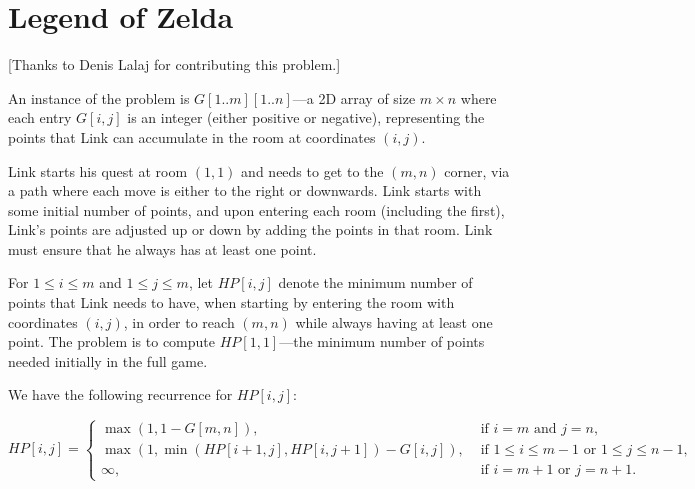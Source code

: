 \documentclass[11pt,fleqn]{exam}
\begin{document}
\newpage

\section{Legend of Zelda}

[Thanks to Denis Lalaj for contributing this problem.]

\vspace{.1in}

An instance of the problem is $G[1..m][1..n]$---a 2D array of size $m \times n$ where each entry $G[i,j]$ is an integer (either positive or negative), representing the points  that Link can accumulate in the room at coordinates $(i,j)$. 

Link starts his quest at room $(1,1)$ and needs to get to the $(m,n)$ corner, via a path where each move is either to the right or downwards. Link starts with some initial number of points, and upon entering each room (including the first), Link's points are adjusted up or down by adding the points in that room. Link must ensure that he always has at least one point.

For $1 \le i \le m$ and $1\le j \le m$, let $HP[i,j]$ denote the minimum number of points that Link needs to have, when starting by entering the room with coordinates $(i, j)$, in order to reach $(m,n)$ while always having at least one point. The problem is to compute $HP[1,1]$---the minimum number of points needed initially in the full game.

We have the following recurrence for $HP[i,j]$:

\[
HP[i,j] = \left\{\begin{array}{ll}
\max(1, 1-G[m,n]), & \mbox{ if  $i=m$ and  $j=n$},\\
\max(1, \min(HP[i+1,j], HP[i,j+1]) -  G[i,j]), & \mbox{ if $1 \le i \le m-1$ or $1\le j \le n-1$}, \\
\infty,  & \mbox{ if $i = m+1$ or $j = n+1$}.
\end{array}
\right.
\]
\end{document}
